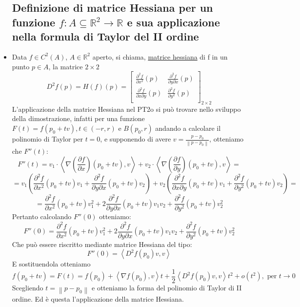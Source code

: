 \documentclass{report}
\newcommand{\ace}{\`e }
\newcommand{\aco}{\`o }
\newcommand{\Ins}[1]{\mathbb{#1}}
\newcommand{\R}{\Ins{R}}
\newcommand{\f}{f: A \subseteq \R^2 \to \R}
\newcommand{\tuple}[1]{\left\langle #1 \right\rangle}
\newcommand{\norma}[1]{\left\lVert#1\right\rVert}
\newcommand{\p}{\partial}
\begin{document}
\begin{itemize}
    \subsection{ Definizione di matrice Hessiana per un funzione $\f$ e sua applicazione nella formula di Taylor del II ordine}
    \item Data $f \in C^2(A)$, $A \in \R^2$ aperto, si chiama, \underline{matrice hessiana}
            di f in un punto $p\in A$, la matrice $2\times 2$
            $$D^2f(p) = H(f)(p) = \begin{bmatrix}
              \frac{\p^2 f}{\p x^2}(p) & \frac{\p^2 f}{\p y \p x}(p) \\
              \frac{\p^2 f}{\p x \p y}(p) & \frac{\p^2 f}{\p y^2}(p) \\
            \end{bmatrix}_{2\times 2}$$
          L'applicazione della matrice Hessiana nel PT2o si pu\aco trovare nello 
          sviluppo della dimostrazione, infatti per una funzione
          $F(t) = f(p_0+tv), t \in (-r,r) \text{ e } B(p_0,r)$ andando a calcolare il polinomio di Taylor 
          per $t = 0$, e supponendo di avere $v = \frac{p-p_0}{\norma{p-p_0}}$,
          otteniamo che $F''(t)$:
          $$F''(t) = v_1 \cdot \tuple{\nabla \left(\frac{\p f}{\p x}\right)(p_0+tv), v} + 
                      v_2 \cdot \tuple{\nabla \left(\frac{\p f}{\p y}\right)(p_0+tv), v} = $$
          $$= v_1 \left(\frac{\p^2 f}{\p x^2}(p_0+tv)v_1 + \frac{\p^2 f}{\p y \p x}(p_0+tv)v_2\right) + 
              v_2 \left( \frac{\p^2 f}{\p x \p y}(p_0+tv)v_1 + \frac{\p^2 f}{\p y^2}(p_0+tv)v_2\right) = $$
          $$ = \frac{\p^2 f}{\p x^2}(p_0+tv)v_1^2 + 2 \frac{\p^2 f}{\p y \p x}(p_0+tv)v_1 v_2 + 
                \frac{\p^2 f}{\p y^2}(p_0 + tv)v_2^2$$
          Pertanto calcolando $F''(0)$ otteniamo:
          $$F''(0) = \frac{\p^2 f}{\p x^2}(p_0+tv)v_1^2 + 2 \frac{\p^2 f}{\p y \p x}(p_0+tv)v_1 v_2 + 
            \frac{\p^2 f}{\p y^2}(p_0 + tv)v_2^2$$
          Che pu\aco essere riscritto mediante matrice Hessiana del tipo:
          $$F''(0) = \tuple{D^2f(p_0)v,v}$$
          E sostituendola otteniamo
          $$f(p_0+tv) = F(t) = f(p_0) + \tuple{\nabla f(p_0), v}t + \frac{1}{2} \tuple{D^2 f(p_0)v, v}t^2 + o(t^2) , \text{ per } t \to 0$$
          Scegliendo $t = \norma{p-p_0}$ e otteniamo la forma del polinomio di Taylor di II ordine. 
          Ed \ace questa l'applicazione della matrice Hessiana.
    

\end{itemize}
\end{document}
